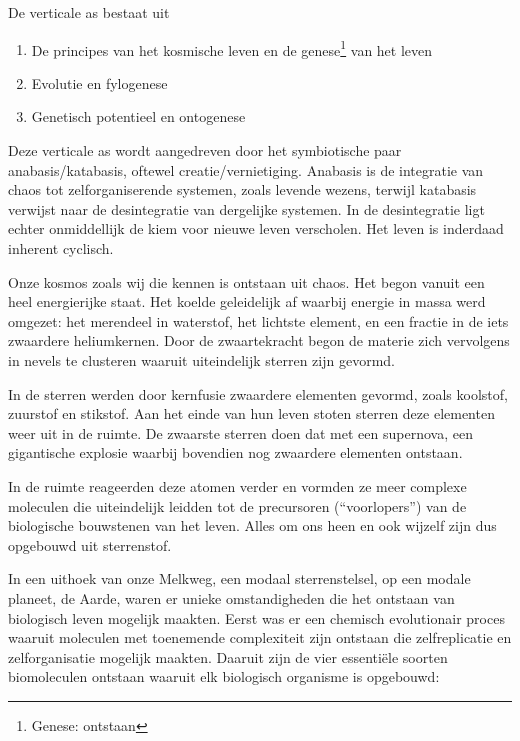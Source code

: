 \documentclass[
  11pt,
]{book}
\providecommand{\tightlist}{%
  \setlength{\itemsep}{0pt}\setlength{\parskip}{0pt}}
\begin{document}
De verticale as bestaat uit

\begin{enumerate}
\def\labelenumi{\arabic{enumi}.}
\tightlist
\item
  De principes van het kosmische leven en de genese\footnote{Genese: ontstaan} van het leven
\item
  Evolutie en fylogenese
\item
  Genetisch potentieel en ontogenese
\end{enumerate}

Deze verticale as wordt aangedreven door het symbiotische paar anabasis/katabasis, oftewel creatie/vernietiging. Anabasis is de integratie van chaos tot zelforganiserende systemen, zoals levende wezens, terwijl katabasis verwijst naar de desintegratie van dergelijke systemen. In de desintegratie ligt echter onmiddellijk de kiem voor nieuwe leven verscholen. Het leven is inderdaad inherent cyclisch.

Onze kosmos zoals wij die kennen is ontstaan uit chaos. Het begon vanuit een heel energierijke staat. Het koelde geleidelijk af waarbij energie in massa werd omgezet: het merendeel in waterstof, het lichtste element, en een fractie in de iets zwaardere heliumkernen. Door de zwaartekracht begon de materie zich vervolgens in nevels te clusteren waaruit uiteindelijk sterren zijn gevormd.

In de sterren werden door kernfusie zwaardere elementen gevormd, zoals koolstof, zuurstof en stikstof. Aan het einde van hun leven stoten sterren deze elementen weer uit in de ruimte. De zwaarste sterren doen dat met een supernova, een gigantische explosie waarbij bovendien nog zwaardere elementen ontstaan.

In de ruimte reageerden deze atomen verder en vormden ze meer complexe moleculen die uiteindelijk leidden tot de precursoren (``voorlopers'') van de biologische bouwstenen van het leven. Alles om ons heen en ook wijzelf zijn dus opgebouwd uit sterrenstof.

In een uithoek van onze Melkweg, een modaal sterrenstelsel, op een modale planeet, de Aarde, waren er unieke omstandigheden die het ontstaan van biologisch leven mogelijk maakten. Eerst was er een chemisch evolutionair proces waaruit moleculen met toenemende complexiteit zijn ontstaan die zelfreplicatie en zelforganisatie mogelijk maakten. Daaruit zijn de vier essentiële soorten biomoleculen ontstaan waaruit elk biologisch organisme is opgebouwd:
\end{document}
